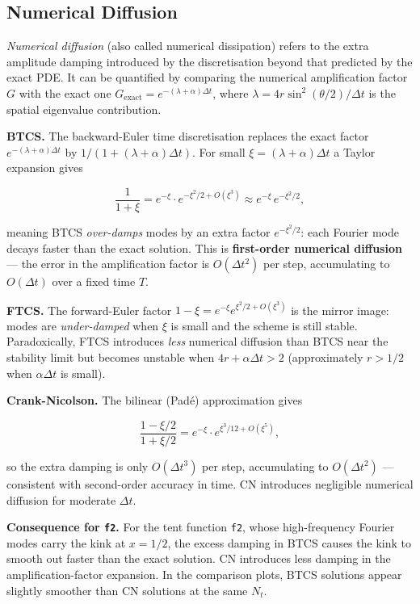 \documentclass[11pt,a4paper]{article}
\begin{document}
\subsection{Numerical Diffusion}

\emph{Numerical diffusion} (also called numerical dissipation) refers to the extra amplitude damping introduced by the discretisation beyond that predicted by the exact PDE. It can be quantified by comparing the numerical amplification factor $G$ with the exact one $G_{\text{exact}} = e^{-(\lambda + \alpha)\Delta t}$, where $\lambda = 4r\sin^2(\theta/2)/\Delta t$ is the spatial eigenvalue contribution.

\textbf{BTCS.} The backward-Euler time discretisation replaces the exact factor $e^{-(\lambda+\alpha)\Delta t}$ by $1/(1+(\lambda+\alpha)\Delta t)$. For small $\xi = (\lambda+\alpha)\Delta t$ a Taylor expansion gives

\begin{equation}
\frac{1}{1+\xi} = e^{-\xi}\cdot e^{-\xi^2/2 + O(\xi^3)} \approx e^{-\xi}\,e^{-\xi^2/2}, \tag{48}
\end{equation}

meaning BTCS \emph{over-damps} modes by an extra factor $e^{-\xi^2/2}$: each Fourier mode decays faster than the exact solution. This is \textbf{first-order numerical diffusion} — the error in the amplification factor is $O(\Delta t^2)$ per step, accumulating to $O(\Delta t)$ over a fixed time $T$.

\textbf{FTCS.} The forward-Euler factor $1 - \xi = e^{-\xi}e^{\xi^2/2+O(\xi^3)}$ is the mirror image: modes are \emph{under-damped} when $\xi$ is small and the scheme is still stable. Paradoxically, FTCS introduces \emph{less} numerical diffusion than BTCS near the stability limit but becomes unstable when $4r+\alpha\Delta t>2$ (approximately $r>1/2$ when $\alpha\Delta t$ is small).

\textbf{Crank-Nicolson.} The bilinear (Padé) approximation gives

\begin{equation}
\frac{1-\xi/2}{1+\xi/2} = e^{-\xi}\cdot e^{\xi^3/12 + O(\xi^5)}, \tag{49}
\end{equation}

so the extra damping is only $O(\Delta t^3)$ per step, accumulating to $O(\Delta t^2)$ — consistent with second-order accuracy in time. CN introduces negligible numerical diffusion for moderate $\Delta t$.

\textbf{Consequence for \texttt{f2}.} For the tent function \texttt{f2}, whose high-frequency Fourier modes carry the kink at $x=1/2$, the excess damping in BTCS causes the kink to smooth out faster than the exact solution. CN introduces less damping in the amplification-factor expansion. In the comparison plots, BTCS solutions appear slightly smoother than CN solutions at the same $N_t$.
\end{document}
